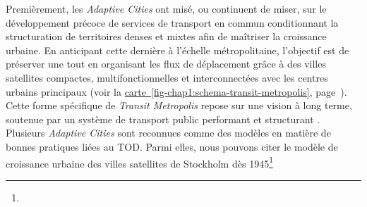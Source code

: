 \begin{refsegment}
Premièrement, les \textsl{Adaptive Cities} ont misé, ou continuent de miser, sur le développement précoce de services de transport en commun conditionnant la structuration de territoires denses et mixtes afin de maîtriser la croissance urbaine. En anticipant cette dernière à l'échelle métropolitaine, l'objectif est de préserver une  tout en organisant les flux de déplacement grâce à des villes satellites compactes, multifonctionnelles et interconnectées avec les centres urbains principaux (voir la \hyperref[fig-chap1:schema-transit-metropolis]{carte~\ref{fig-chap1:schema-transit-metropolis}}, page~\pageref{fig-chap1:schema-transit-metropolis}). Cette forme spécifique de \textsl{Transit Metropolis} repose sur une vision à long terme, soutenue par un système de transport public performant et structurant \textcolor{blue}{\autocite[132]{cervero_transit_1998}}. Plusieurs \textsl{Adaptive Cities} sont reconnues comme des modèles en matière de bonnes pratiques liées au \acrshort{TOD}. Parmi elles, nous pouvons citer le modèle de croissance urbaine des villes satellites de Stockholm dès 1945\footnote{
}
\end{refsegment}
